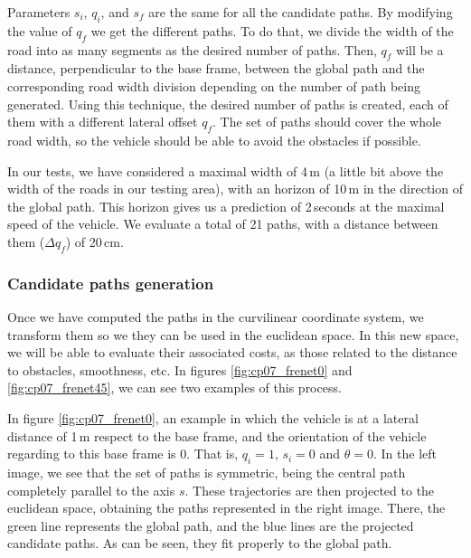 Parameters $s_i$, $q_i$, and $s_f$ are the same for all the candidate paths. By modifying the value of $q_f$ we get the different paths. To do that, we divide the width of the road into as many segments as the desired number of paths. Then, $q_f$ will be a distance, perpendicular to the base frame, between the global path and the corresponding road width division depending on the number of path being generated. Using this technique, the desired number of paths is created, each of them with a different lateral offset $q_f$. The set of paths should cover the whole road width, so the vehicle should be able to avoid the obstacles if possible.

In our tests, we have considered a maximal width of 4\,m (a little bit above the width of the roads in our testing area), with an horizon of 10\,m in the direction of the global path. This horizon gives us a prediction of 2\,seconds at the maximal speed of the vehicle. We evaluate a total of 21 paths, with a distance between them ($\Delta q_f$) of 20\,cm.

\subsubsection{Candidate paths generation}\label{ch:chapter07_01_03_02}

Once we have computed the paths in the curvilinear coordinate system, we transform them so we they can be used in the euclidean space. In this new space, we will be able to evaluate their associated costs, as those related to the distance to obstacles, smoothness, etc. In figures \ref{fig:cp07_frenet0} and \ref{fig:cp07_frenet45}, we can see two examples of this process.

In figure \ref{fig:cp07_frenet0}, an example in which the vehicle is at a lateral distance of 1\,m respect to the base frame, and the orientation of the vehicle regarding to this base frame is 0. That is, $q_i = 1$, $s_i = 0$ and $\theta = 0$. In the left image, we see that the set of paths is symmetric, being the central path completely parallel to the axis $s$. These trajectories are then projected to the euclidean space, obtaining the paths represented in the right image. There, the green line represents the global path, and the blue lines are the projected candidate paths. As can be seen, they fit properly to the global path.

